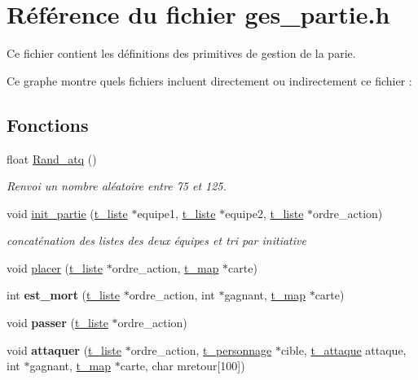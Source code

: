 \hypertarget{a00021}{}\section{Référence du fichier ges\+\_\+partie.\+h}
\label{a00021}


Ce fichier contient les définitions des primitives de gestion de la parie.  


Ce graphe montre quels fichiers incluent directement ou indirectement ce fichier \+:
\subsection*{Fonctions}
\begin{DoxyCompactItemize}
\item 
float \hyperlink{a00021_a44cb47c181795d82c170cdbadad15b8d}{Rand\+\_\+atq} ()
\begin{DoxyCompactList}\small\item\em Renvoi un nombre aléatoire entre 75 et 125. \end{DoxyCompactList}\item 
void \hyperlink{a00021_abb116819eae188f98872feae746df2de}{init\+\_\+partie} (\hyperlink{a00007}{t\+\_\+liste} $\ast$equipe1, \hyperlink{a00007}{t\+\_\+liste} $\ast$equipe2, \hyperlink{a00007}{t\+\_\+liste} $\ast$ordre\+\_\+action)
\begin{DoxyCompactList}\small\item\em concaténation des listes des deux équipes et tri par initiative \end{DoxyCompactList}\item 
void \hyperlink{a00021_a41a1d27b41237396733145ba55fb9ca0}{placer} (\hyperlink{a00007}{t\+\_\+liste} $\ast$ordre\+\_\+action, \hyperlink{a00008}{t\+\_\+map} $\ast$carte)
\item 
int {\bfseries est\+\_\+mort} (\hyperlink{a00007}{t\+\_\+liste} $\ast$ordre\+\_\+action, int $\ast$gagnant, \hyperlink{a00008}{t\+\_\+map} $\ast$carte)\hypertarget{a00021_ab8eb413515574b9dce7701c79d807d8d}{}\label{a00021_ab8eb413515574b9dce7701c79d807d8d}

\item 
void {\bfseries passer} (\hyperlink{a00007}{t\+\_\+liste} $\ast$ordre\+\_\+action)\hypertarget{a00021_a016a187083e2fb18efad89a26fc02d69}{}\label{a00021_a016a187083e2fb18efad89a26fc02d69}

\item 
void {\bfseries attaquer} (\hyperlink{a00007}{t\+\_\+liste} $\ast$ordre\+\_\+action, \hyperlink{a00010}{t\+\_\+personnage} $\ast$cible, \hyperlink{a00004}{t\+\_\+attaque} attaque, int $\ast$gagnant, \hyperlink{a00008}{t\+\_\+map} $\ast$carte, char mretour\mbox{[}100\mbox{]})\hypertarget{a00021_a41d099b21befbd25c4e7effd38da869f}{}\label{a00021_a41d099b21befbd25c4e7effd38da869f}


\end{DoxyCompactItemize}
